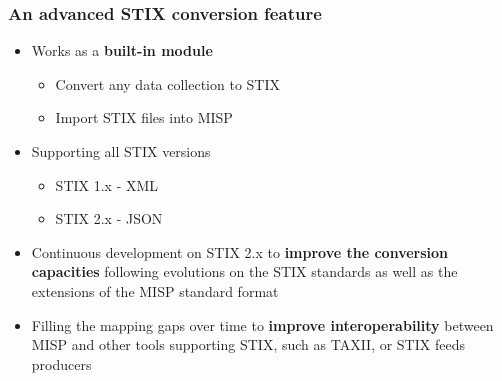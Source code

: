 \begin{frame}
    \frametitle{An advanced STIX conversion feature}
    \begin{itemize}
        \item Works as a \textbf{built-in module}
        \begin{itemize}
            \item Convert any data collection to STIX
            \item Import STIX files into MISP
        \end{itemize}
        \item Supporting all STIX versions
        \begin{itemize}
            \item STIX 1.x - XML
            \item STIX 2.x - JSON
        \end{itemize}
        \item Continuous development on STIX 2.x to \textbf{improve the conversion capacities} following evolutions on the STIX standards as well as the extensions of the MISP standard format
        \item Filling the mapping gaps over time to \textbf{improve interoperability} between MISP and other tools supporting STIX, such as TAXII, or STIX feeds producers
    \end{itemize}
\end{frame}
